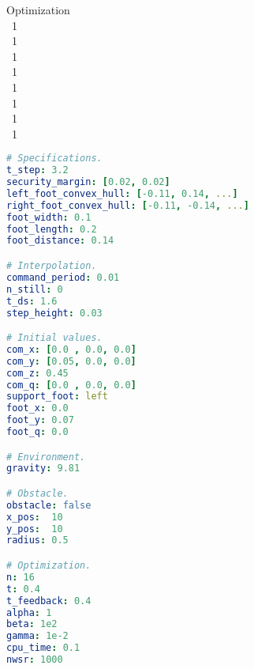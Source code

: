 \begin{minipage}{1.\textwidth}
\begin{minipage}{0.3\textwidth}
{			\hfill Optimization\\
			\mbox{}~\hfill 1\\
			\mbox{}~\hfill 1\\
			\mbox{}~\hfill 1\\
			\mbox{}~\hfill 1\\
			\mbox{}~\hfill 1\\
			\mbox{}~\hfill 1\\
			\mbox{}~\hfill 1\\
			\mbox{}~\hfill 1}
	\end{minipage}
	\begin{minipage}{0.7\textwidth}
		\begin{lstlisting}[language=yaml]
# Specifications.
t_step: 3.2
security_margin: [0.02, 0.02]
left_foot_convex_hull: [-0.11, 0.14, ...]
right_foot_convex_hull: [-0.11, -0.14, ...]
foot_width: 0.1
foot_length: 0.2
foot_distance: 0.14

# Interpolation.
command_period: 0.01
n_still: 0
t_ds: 1.6
step_height: 0.03

# Initial values.
com_x: [0.0 , 0.0, 0.0]
com_y: [0.05, 0.0, 0.0]
com_z: 0.45
com_q: [0.0 , 0.0, 0.0]
support_foot: left
foot_x: 0.0
foot_y: 0.07
foot_q: 0.0

# Environment.
gravity: 9.81

# Obstacle.
obstacle: false
x_pos:  10
y_pos:  10
radius: 0.5

# Optimization.
n: 16
t: 0.4
t_feedback: 0.4
alpha: 1
beta: 1e2
gamma: 1e-2
cpu_time: 0.1
nwsr: 1000
		\end{lstlisting}
	\end{minipage}
\end{minipage}







